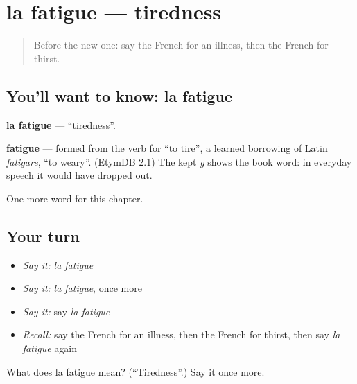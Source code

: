 \section[la fatigue]{la fatigue — tiredness}

\label{lesson:FR-C54-fatigue}



\begin{quote}
Before the new one: say the French for an illness, then the French for thirst.
\end{quote}

\subsection*{You'll want to know: la fatigue}
\textbf{la fatigue} — \textquotedblleft{}tiredness\textquotedblright{}.

\begin{cousinweb}
\textbf{fatigue} — formed from the verb for \textquotedblleft{}to tire\textquotedblright{}, a learned borrowing of Latin \emph{fatigare}, \textquotedblleft{}to weary\textquotedblright{}. (EtymDB 2.1) The kept \emph{g} shows the book word: in everyday speech it would have dropped out.
\end{cousinweb}

\begin{grammarlens}[title={What you've built}]
One more word for this chapter.
\end{grammarlens}

\subsection*{Your turn}
\begin{itemize}
\raggedright
  \item \emph{Say it:} \emph{la fatigue}
  \item \emph{Say it:} \emph{la fatigue}, once more
  \item \emph{Say it:} say \emph{la fatigue}
  \item \emph{Recall:} say the French for an illness, then the French for thirst, then say \emph{la fatigue} again
\end{itemize}

\begin{tcolorbox}[breakable,colback=teal!4,colframe=teal!35!black,title={Before you move on}]
What does la fatigue mean? (\textquotedblleft{}Tiredness\textquotedblright{}.) Say it once more.
\end{tcolorbox}
